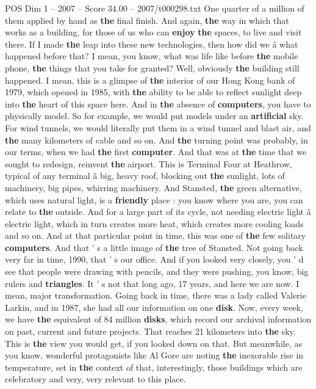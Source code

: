 \begin{textsample}{POS Dim 1 – 2007 – Score 34.00 – 2007/t000298.txt}
One quarter of a million of them applied by hand as \textbf{the} final finish.
And again, \textbf{the} way in which that works as a building, for those of us who can \textbf{enjoy} \textbf{the} spaces, to live and visit there.
If I made \textbf{the} leap into these new technologies, then how did we â what happened before that?
I mean, you know, what was life like before \textbf{the} mobile phone, \textbf{the} things that you take for granted?
Well, obviously \textbf{the} building still happened.
I mean, this is a glimpse of \textbf{the} interior of our Hong Kong bank of 1979, which opened in 1985, with \textbf{the} ability to be able to reflect sunlight deep into \textbf{the} heart of this space here.
And in \textbf{the} absence of \textbf{computers}, you have to physically model.
So for example, we would put models under an \textbf{artificial} sky.
For wind tunnels, we would literally put them in a wind tunnel and blast air, and \textbf{the} many kilometers of cable and so on.
And \textbf{the} turning point was probably, in our terms, when we had \textbf{the} first \textbf{computer}.
And that was at \textbf{the} time that we sought to redesign, reinvent \textbf{the} airport.
This is Terminal Four at Heathrow, typical of any terminal â big, heavy roof, blocking out \textbf{the} sunlight, lots of machinery, big pipes, whirring machinery.
And Stansted, \textbf{the} green alternative, which uses natural light, is a \textbf{friendly} place : you know where you are, you can relate to \textbf{the} outside.
And for a large part of its cycle, not needing electric light â electric light, which in turn creates more heat, which creates more cooling loads and so on.
And at that particular point in time, this was one of \textbf{the} few solitary \textbf{computers}.
And that ' s a little image of \textbf{the} tree of Stansted.
Not going back very far in time, 1990, that ' s our office.
And if you looked very closely, you ' d see that people were drawing with pencils, and they were pushing, you know, big rulers and \textbf{triangles}.
It ' s not that long ago, 17 years, and here we are now.
I mean, major transformation.
Going back in time, there was a lady called Valerie Larkin, and in 1987, she had all our information on one \textbf{disk}.
Now, every week, we have \textbf{the} equivalent of 84 million \textbf{disks}, which record our archival information on past, current and future projects.
That reaches 21 kilometers into \textbf{the} sky.
This is \textbf{the} view you would get, if you looked down on that.
But meanwhile, as you know, wonderful protagonists like Al Gore are noting \textbf{the} inexorable rise in temperature, set in \textbf{the} context of that, interestingly, those buildings which are celebratory and very, very relevant to this place.

\end{textsample}
